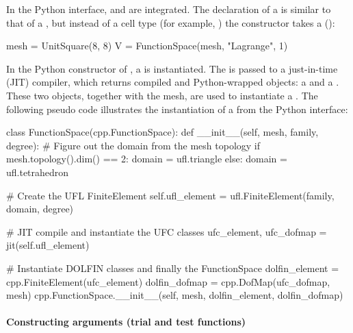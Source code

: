 In the Python interface,  and
 are integrated. The declaration of a
 is similar to that of a ,
but instead of a cell type (for example, ) the
 constructor takes a  ():
\begin{python}
mesh = UnitSquare(8, 8)
V = FunctionSpace(mesh, "Lagrange", 1)
\end{python}
In the Python constructor of , a
 is instantiated. The 
is passed to a just-in-time (JIT) compiler, which returns compiled
and Python-wrapped  objects: a 
and a . These two objects, together with the mesh,
are used to instantiate a . The following pseudo
code illustrates the instantiation of a  from the
Python interface:
\begin{python}
class FunctionSpace(cpp.FunctionSpace):
    def __init__(self, mesh, family, degree):
        # Figure out the domain from the mesh topology
        if mesh.topology().dim() == 2:
            domain = ufl.triangle
        else:
            domain = ufl.tetrahedron

        # Create the UFL FiniteElement
        self.ufl_element = ufl.FiniteElement(family, domain, degree)

        # JIT compile and instantiate the UFC classes
        ufc_element, ufc_dofmap = jit(self.ufl_element)

        # Instantiate DOLFIN classes and finally the FunctionSpace
        dolfin_element = cpp.FiniteElement(ufc_element)
        dolfin_dofmap = cpp.DofMap(ufc_dofmap, mesh)
        cpp.FunctionSpace.__init__(self, mesh, dolfin_element, dolfin_dofmap)
\end{python}

\paragraph{Constructing arguments (trial and test functions)}

